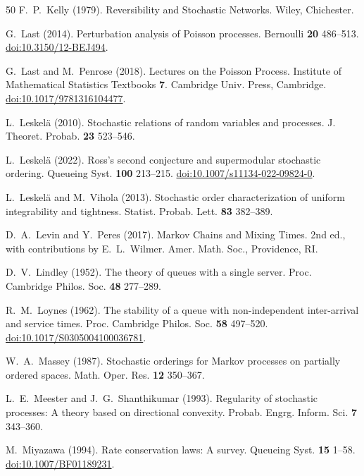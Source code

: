 \documentclass[11pt,reqno]{amsart}
\numberwithin{equation}{section}
\theoremstyle{plain}
\theoremstyle{definition}
\newcommand{\1}{\mathbf 1}
\begin{document}
\begin{thebibliography}{50}
F.~P.~Kelly (1979).
Reversibility and Stochastic Networks.
Wiley, Chichester.

G.~Last (2014).
Perturbation analysis of Poisson processes.
Bernoulli \textbf{20} 486--513.
\href{https://doi.org/10.3150/12-BEJ494}{doi:10.3150/12-BEJ494}.

G.~Last and M.~Penrose (2018).
Lectures on the Poisson Process.
Institute of Mathematical Statistics Textbooks \textbf{7}. Cambridge Univ. Press, Cambridge.
\href{https://doi.org/10.1017/9781316104477}{doi:10.1017/9781316104477}.

L.~Leskel\"a (2010).
Stochastic relations of random variables and processes.
J. Theoret. Probab. \textbf{23} 523--546.

L.~Leskel\"a (2022).
Ross's second conjecture and supermodular stochastic ordering.
Queueing Syst. \textbf{100} 213--215.
\href{https://doi.org/10.1007/s11134-022-09824-0}{doi:10.1007/s11134-022-09824-0}.

L.~Leskel\"a and M.~Vihola (2013).
Stochastic order characterization of uniform integrability and tightness.
Statist. Probab. Lett. \textbf{83} 382--389.

D.~A.~Levin and Y.~Peres (2017).
Markov Chains and Mixing Times.
2nd ed., with contributions by E.~L.~Wilmer. Amer. Math. Soc., Providence, RI.

D.~V.~Lindley (1952).
The theory of queues with a single server.
Proc. Cambridge Philos. Soc. \textbf{48} 277--289.

R.~M.~Loynes (1962).
The stability of a queue with non-independent inter-arrival and service times.
Proc. Cambridge Philos. Soc. \textbf{58} 497--520.
\href{https://doi.org/10.1017/S0305004100036781}{doi:10.1017/S0305004100036781}.

W.~A.~Massey (1987).
Stochastic orderings for Markov processes on partially ordered spaces.
Math. Oper. Res. \textbf{12} 350--367.

L.~E.~Meester and J.~G.~Shanthikumar (1993).
Regularity of stochastic processes: A theory based on directional convexity.
Probab. Engrg. Inform. Sci. \textbf{7} 343--360.

M.~Miyazawa (1994).
Rate conservation laws: A survey.
Queueing Syst. \textbf{15} 1--58.
\href{https://doi.org/10.1007/BF01189231}{doi:10.1007/BF01189231}.


\end{thebibliography}
\end{document}
